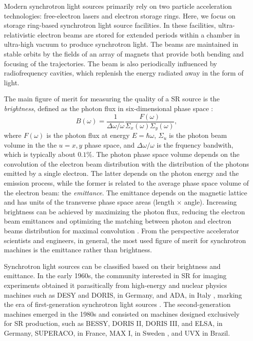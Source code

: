 Modern synchrotron light sources primarily rely on two particle acceleration technologies: free-electron lasers and electron storage rings. Here, we focus on storage ring-based synchrotron light source facilities. In these facilities, ultra-relativistic electron beams are stored for extended periods within a chamber in ultra-high vacuum to produce synchrotron light. The beams are maintained in stable orbits by the fields of an array of magnets that provide both bending and focusing of the trajectories. The beam is also periodically influenced by radiofrequency cavities, which replenish the energy radiated away in the form of light.

The main figure of merit for measuring the quality of a SR source is the \textit{brightness}\cite{huang_brightness_2013}, defined as the photon flux in six-dimensional phase space \cite{hettel_challenges_2014}:
\begin{equation}
    B(\omega) = \frac{1}{\Delta \omega/\omega}\frac{F(\omega)}{\Sigma_{x}(\omega)\Sigma_{y}(\omega)},
\end{equation}
where $F(\omega)$ is the photon flux at energy $E=\hbar\omega$, $\Sigma_{u}$ is the photon beam volume in the the $u=x,y$ phase space, and $\Delta\omega/\omega$ is the frquency bandwith, which is typically about $0.1\%$. The photon phase space volume depends on the convolution of the electron beam distribution with the distribution of the photons emitted by a single electron. The latter depends on the photon energy and the emission process, while the former is related to the average phase space volume of the electron beam: the \textit{emittance}. The emittance depends on the magnetic lattice and has units of the transverse phase space areas (length $\times$ angle). Increasing brightness can be achieved by maximizing the photon flux, reducing the electron beam emittances and optimizing the matching between photon and electron beams distribution for maximal convolution \cite{wiedemann_particle_2015}. From the perspective accelerator scientists and engineers, in general, the most used figure of merit for synchrotron machines is the emittance rather than brightness.

Synchrotron light sources can be classified based on their brightness and emittance. In the early 1960s, the community interested in SR for imaging experiments obtained it parasitically from high-energy and nuclear physics machines such as DESY and DORIS, in Germany, and ADA, in Italy \cite{simoulin_synchrotron_2016}, marking the era of first-generation synchrotron light sources \cite{liu_towards_2017}. The second-generation machines emerged in the 1980s and consisted on machines designed exclusively for SR production, such as BESSY, DORIS II, DORIS III,  and ELSA, in Germany, SUPERACO, in France, MAX I, in Sweden \cite{simoulin_synchrotron_2016}, and UVX in Brazil.

